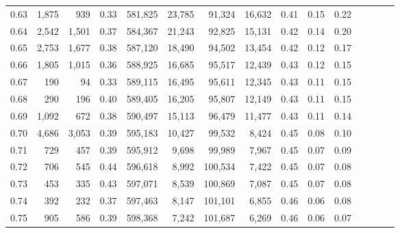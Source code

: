 \begin{tabular}{rrrcrrrrrrrrrrr}
0.63 &   1,875 &    939 &                                       0.33 &  581,825 &   23,785 &   91,324 &   16,632 &  0.41 &  0.15 &                         0.22 \\
0.64 &   2,542 &  1,501 &                                       0.37 &  584,367 &   21,243 &   92,825 &   15,131 &  0.42 &  0.14 &                         0.20 \\
0.65 &   2,753 &  1,677 &                                       0.38 &  587,120 &   18,490 &   94,502 &   13,454 &  0.42 &  0.12 &                         0.17 \\
0.66 &   1,805 &  1,015 &                                       0.36 &  588,925 &   16,685 &   95,517 &   12,439 &  0.43 &  0.12 &                         0.15 \\
0.67 &     190 &     94 &                                       0.33 &  589,115 &   16,495 &   95,611 &   12,345 &  0.43 &  0.11 &                         0.15 \\
0.68 &     290 &    196 &                                       0.40 &  589,405 &   16,205 &   95,807 &   12,149 &  0.43 &  0.11 &                         0.15 \\
0.69 &   1,092 &    672 &                                       0.38 &  590,497 &   15,113 &   96,479 &   11,477 &  0.43 &  0.11 &                         0.14 \\
0.70 &   4,686 &  3,053 &                                       0.39 &  595,183 &   10,427 &   99,532 &    8,424 &  0.45 &  0.08 &                         0.10 \\
0.71 &     729 &    457 &                                       0.39 &  595,912 &    9,698 &   99,989 &    7,967 &  0.45 &  0.07 &                         0.09 \\
0.72 &     706 &    545 &                                       0.44 &  596,618 &    8,992 &  100,534 &    7,422 &  0.45 &  0.07 &                         0.08 \\
0.73 &     453 &    335 &                                       0.43 &  597,071 &    8,539 &  100,869 &    7,087 &  0.45 &  0.07 &                         0.08 \\
0.74 &     392 &    232 &                                       0.37 &  597,463 &    8,147 &  101,101 &    6,855 &  0.46 &  0.06 &                         0.08 \\
0.75 &     905 &    586 &                                       0.39 &  598,368 &    7,242 &  101,687 &    6,269 &  0.46 &  0.06 &                         0.07 \\

\end{tabular}
